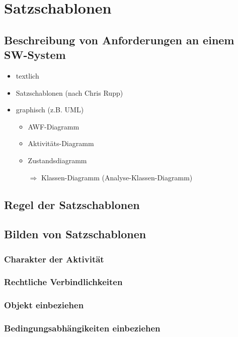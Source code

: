 \documentclass{scrreprt}
\begin{document}
\section{Satzschablonen}
\subsection{Beschreibung von Anforderungen an einem SW-System}
\begin{itemize}
\item textlich
\item Satzschablonen (nach Chris Rupp)
\item graphisch (z.B. UML)
\begin{itemize}
\item AWF-Diagramm
\item Aktivitäts-Diagramm
\item Zustandsdiagramm
\item[$\Rightarrow$] Klassen-Diagramm (Analyse-Klassen-Diagramm)
\end{itemize}
\end{itemize}

\subsection{Regel der Satzschablonen}

\subsection{Bilden von Satzschablonen}

\subsubsection{Charakter der Aktivität}

\subsubsection{Rechtliche Verbindlichkeiten}

\subsubsection{Objekt einbeziehen}

\subsubsection{Bedingungsabhängikeiten einbeziehen}
\end{document}
